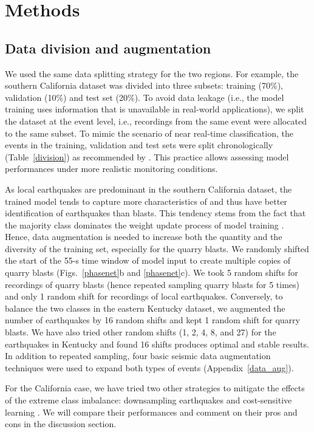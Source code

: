 \documentclass{gji}
\begin{document}
\section{Methods}
\subsection{Data division and augmentation}
We used the same data splitting strategy for the two regions. For example, the southern California dataset was divided into three subsets: training (70\%), validation (10\%) and test set (20\%). To avoid data leakage (i.e., the model training uses information that is unavailable in real-world applications), we split the dataset at the event level, i.e., recordings from the same event were allocated to the same subset. To mimic the scenario of near real-time classification, the events in the training, validation and test sets were split chronologically (Table~\ref{division}) as recommended by \cite{linville_19}. This practice allows assessing model performances under more realistic monitoring conditions.

As local earthquakes are predominant in the southern California dataset, the trained model tends to capture more characteristics of and thus have better identification of earthquakes than blasts. This tendency stems from the fact that the majority class dominates the weight update process of model training \citep{imbalance}. Hence, data augmentation is needed to increase both the quantity and the diversity of the training set, especially for the quarry blasts. We randomly shifted the start of the 55-s time window of model input to create multiple copies of quarry blasts (Figs.~\ref{phasenet}b and \ref{phasenet}c). We took 5 random shifts for recordings of quarry blasts (hence repeated sampling quarry blasts for 5 times) and only 1 random shift for recordings of local earthquakes. Conversely, to balance the two classes in the eastern Kentucky dataset, we augmented the number of earthquakes by 16 random shifts and kept 1 random shift for quarry blasts. We have also tried other random shifts (1, 2, 4, 8, and 27) for the earthquakes in Kentucky and found 16 shifts produces optimal and stable results. In addition to repeated sampling, four basic seismic data augmentation techniques were used to expand both types of events (Appendix~\ref{data_aug}).

For the California case, we have tried two other strategies to mitigate the effects of the extreme class imbalance: downsampling earthquakes and cost-sensitive learning \citep{cost_sensitive}. We will compare their performances and comment on their pros and cons in the discussion section.
\end{document}

